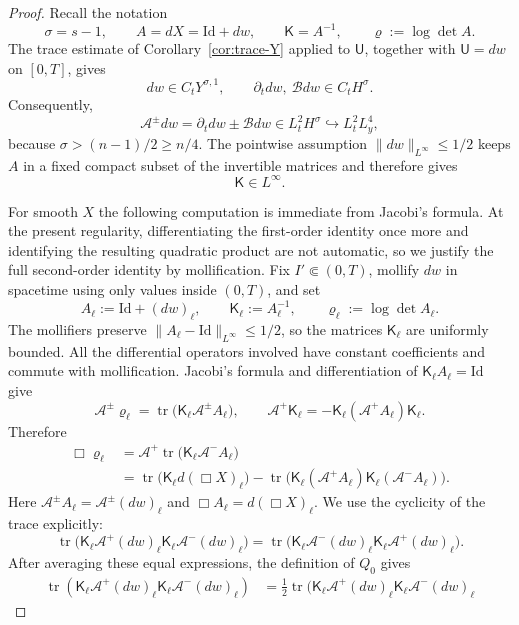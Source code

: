 \documentclass[10pt,a4paper]{amsart}
\newcommand{\Kmat}{\mathsf K}
\newcommand{\Ufield}{\mathsf U}
\DeclareMathOperator{\tr}{tr}
\begin{document}
\begin{proof}
Recall the notation
\[
 \sigma=s-1
 ,
 \qquad
 A=dX=\mathrm{Id}+dw,
 \qquad
 \Kmat=A^{-1},
 \qquad
 \varrho:=\log\det A.
\]
The trace estimate of Corollary~\ref{cor:trace-Y} applied to $\Ufield$, together with
$\Ufield=dw$ on $[0,T]$, gives
\[
 dw\in C_tY^{\sigma,1},
 \qquad
 \partial_tdw,\ \mathcal Bdw\in C_tH^\sigma.
\]
Consequently,
\[
 \mathcal A^\pm dw
 =\partial_tdw\pm\mathcal Bdw
 \in L^2_tH^\sigma
 \hookrightarrow L^2_tL^4_y,
\]
because $\sigma>(n-1)/2\ge n/4$.  The pointwise assumption
$\|dw\|_{L^\infty}\le 1/2$ keeps $A$ in a fixed compact subset of
the invertible matrices and therefore gives
\[
 \Kmat\in L^\infty.
\]

For smooth $X$ the following computation is immediate from Jacobi's formula.
At the present regularity, differentiating the first-order identity once more
and identifying the resulting quadratic product are not automatic, so we
justify the full second-order identity by mollification. Fix
$I'\Subset(0,T)$, mollify $dw$ in spacetime using only values inside
$(0,T)$, and set
\[
 A_\ell:=\mathrm{Id}+(dw)_\ell,
 \qquad
 \Kmat_\ell:=A_\ell^{-1},
 \qquad
 \varrho_\ell:=\log\det A_\ell.
\]
The mollifiers preserve
$\|A_\ell-\mathrm{Id}\|_{L^\infty}\le1/2$, so the matrices
$\Kmat_\ell$ are uniformly bounded. All the differential operators involved
have constant coefficients and commute with mollification. Jacobi's formula
and differentiation of $\Kmat_\ell A_\ell=\mathrm{Id}$ give
\[
 \mathcal A^\pm\varrho_\ell
 =\tr\bigl(\Kmat_\ell\mathcal A^\pm A_\ell\bigr),
 \qquad
 \mathcal A^+\Kmat_\ell
 =-\Kmat_\ell(\mathcal A^+A_\ell)\Kmat_\ell.
\]
Therefore
\begin{align*}
 \Box\varrho_\ell
 &=\mathcal A^+\tr\bigl(\Kmat_\ell\mathcal A^-A_\ell\bigr)\\
 &=\tr\bigl(\Kmat_\ell d(\Box X)_\ell\bigr)
   -\tr\bigl(
       \Kmat_\ell(\mathcal A^+A_\ell)
       \Kmat_\ell(\mathcal A^-A_\ell)
     \bigr).
\end{align*}
Here $\mathcal A^\pm A_\ell=\mathcal A^\pm(dw)_\ell$ and
$\Box A_\ell=d(\Box X)_\ell$. We use the cyclicity of the trace explicitly:
\[
 \tr\bigl(
   \Kmat_\ell\mathcal A^+(dw)_\ell
   \Kmat_\ell\mathcal A^-(dw)_\ell
 \bigr)
 =\tr\bigl(
   \Kmat_\ell\mathcal A^-(dw)_\ell
   \Kmat_\ell\mathcal A^+(dw)_\ell
 \bigr).
\]
After averaging these equal expressions, the definition of $Q_0$ gives
\begin{align*}
 \tr(\Kmat_\ell \mathcal A^+(dw)_\ell \Kmat_\ell \mathcal A^-(dw)_\ell)
 &=\frac12\tr\bigl(
      \Kmat_\ell \mathcal A^+(dw)_\ell \Kmat_\ell \mathcal A^-(dw)_\ell

\end{align*}
\end{proof}
\end{document}
